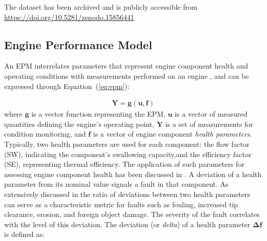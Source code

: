 \documentclass{ecai}
\begin{document}


The dataset has been archived and is publicly accessible from \url{https://doi.org/10.5281/zenodo.15856441}


\subsection{Engine Performance Model}

An EPM interrelates parameters that represent engine component health and operating conditions with measurements performed on an engine \citep{alexiou_development_2005}, and can be expressed through Equation~(\ref{eq:epm}):

\begin{eqnarray}\label{eq:epm}
\mathbf{Y} = \mathbf{g}(\mathbf{u}, \mathbf{f})
\end{eqnarray}
%
where $\mathbf{g}$ is a vector function representing the EPM, $\mathbf{u}$ is a vector of measured 
quantities defining the engine's operating point, $\mathbf{Y}$ is a set of measurements for condition monitoring, and $\mathbf{f}$ is a vector of engine component \textit{health parameters}. Typically, two health parameters are used for each component: the flow factor (SW), indicating the component's swallowing capacity,and the efficiency factor (SE), representing thermal efficiency. The application of such parameters for assessing engine component health has been discussed in \citep{mathioudakis_performance_2001}. A deviation of a health parameter from its nominal value signals a fault in that component. As extensively discussed in \citep{mathioudakis_signatures_2024} the ratio of deviations between two health parameters can serve as a characteristic metric for faults such as fouling, increased tip clearance, erosion, and foreign object damage. The severity of the fault correlates with the level of this deviation. The deviation (or \textit{delta}) of a health parameter $\mathbf{\Delta f}$ is defined as:
\end{document}
